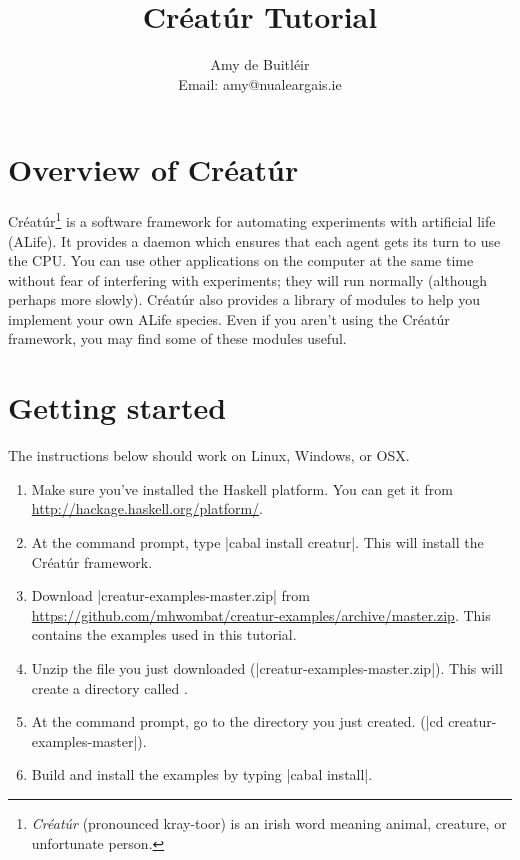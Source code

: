 \documentclass[a4paper,10pt]{report}
\title{Créatúr Tutorial}
\author{Amy de Buitl\'eir\\
        Email: amy@nualeargais.ie}
\begin{document}
\maketitle

\tableofcontents

\chapter{Overview of Créatúr}

Créatúr\footnote{\emph{Créatúr} (pronounced kray-toor) is an irish word 
meaning animal, creature, or unfortunate person.} 
is a software framework for automating experiments
with artificial life (ALife). 
It provides a daemon which ensures that each agent gets its turn 
to use the CPU. 
You can use other applications on the computer at the same time
without fear of interfering with experiments; they
will run normally (although perhaps more slowly).
Créatúr also provides a library of modules to help you implement your own 
ALife species.
Even if you aren't using the Créatúr framework, you may find some of these
modules useful.

\chapter{Getting started}
\label{sec:install}

The instructions below should work on Linux, Windows, or OSX.

\begin{enumerate}
\item Make sure you've installed the Haskell platform. You can get it from
\url{http://hackage.haskell.org/platform/}.

\item At the command prompt, type |cabal install creatur|.
This will install the Créatúr framework.

\item Download |creatur-examples-master.zip| from
\url{https://github.com/mhwombat/creatur-examples/archive/master.zip}.
This contains the examples used in this tutorial.

\item Unzip the file you just downloaded (|creatur-examples-master.zip|).
This will create a directory called .

\item At the command prompt, go to the directory you just created.
(|cd creatur-examples-master|).

\item Build and install the examples by typing |cabal install|.
\end {enumerate}
\end{document}
